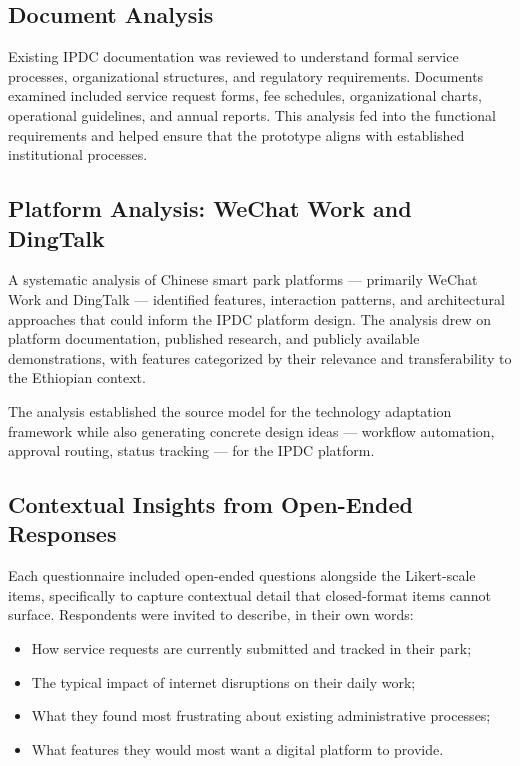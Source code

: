 \subsection{Document Analysis}

Existing IPDC documentation was reviewed to understand formal service processes, organizational structures, and regulatory requirements. Documents examined included service request forms, fee schedules, organizational charts, operational guidelines, and annual reports. This analysis fed into the functional requirements and helped ensure that the prototype aligns with established institutional processes.

\subsection{Platform Analysis: WeChat Work and DingTalk}

A systematic analysis of Chinese smart park platforms --- primarily WeChat Work and DingTalk --- identified features, interaction patterns, and architectural approaches that could inform the IPDC platform design. The analysis drew on platform documentation, published research, and publicly available demonstrations, with features categorized by their relevance and transferability to the Ethiopian context.

The analysis established the source model for the technology adaptation framework while also generating concrete design ideas --- workflow automation, approval routing, status tracking --- for the IPDC platform.

\subsection{Contextual Insights from Open-Ended Responses}

Each questionnaire included open-ended questions alongside the Likert-scale items, specifically to capture contextual detail that closed-format items cannot surface. Respondents were invited to describe, in their own words:

\begin{itemize}
\item How service requests are currently submitted and tracked in their park;
\item The typical impact of internet disruptions on their daily work;
\item What they found most frustrating about existing administrative processes;
\item What features they would most want a digital platform to provide.
\end{itemize}

